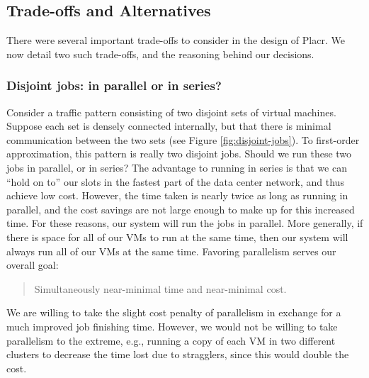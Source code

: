 \documentclass[11pt]{article}
\begin{document}
\subsection{Trade-offs and Alternatives}\label{sec:tradeoffs}

There were several important trade-offs to consider in the design of Placr.  We now detail two such trade-offs, and the reasoning behind our decisions.

\subsubsection{Disjoint jobs: in parallel or in series?}

Consider a traffic pattern consisting of two disjoint sets of virtual machines.  Suppose each set is densely connected internally, but that there is minimal communication between the two sets (see Figure \ref{fig:disjoint-jobs}).  To first-order approximation, this pattern is really two disjoint jobs.  Should we run these two jobs in parallel, or in series?  The advantage to running in series is that we can ``hold on to'' our slots in the fastest part of the data center network, and thus achieve low cost.  However, the time taken is nearly twice as long as running in parallel, and the cost savings are not large enough to make up for this increased time.  For these reasons, our system will run the jobs in parallel.  More generally, if there is space for all of our VMs to run at the same time, then our system will always run all of our VMs at the same time.  Favoring parallelism serves our overall goal:

\begin{quote}
Simultaneously near-minimal time and near-minimal cost.
\end{quote}
We are willing to take the slight cost penalty of parallelism in exchange for a much improved job finishing time.  However, we would not be willing to take parallelism to the extreme, e.g., running a copy of each VM in two different clusters to decrease the time lost due to stragglers, since this would double the cost.
\end{document}
